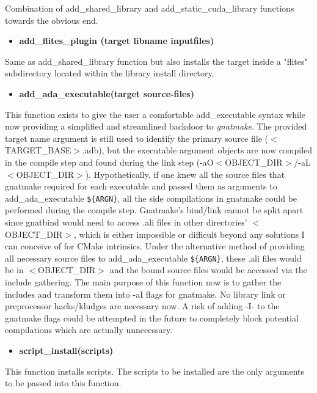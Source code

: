 \documentclass[12pt,letterpaper]{article}
\begin{document}
Combination of add\_shared\_library and add\_static\_cuda\_library functions towards the obvious end.

\begin{itemize}
\item \textbf{add\_flites\_plugin (target libname inputfiles)}
\end{itemize}

Same as add\_shared\_library function but also installs the target inside a "flites" subdirectory located within the library install directory.

\begin{itemize}
\item \textbf{add\_ada\_executable(target source-files)}
\end{itemize}

This function exists to give the user a comfortable add\_executable syntax while now providing a simplified and streamlined backdoor to \emph{gnatmake}.  The provided target name argument is still used to identify the primary source file ($<$TARGET\_BASE$>$.adb), but the executable argument objects are now compiled in the compile step and found during the link step (-aO$<$OBJECT\_DIR$>$/-aL$<$OBJECT\_DIR$>$). Hypothetically, if one knew all the source files that gnatmake required for each executable and passed them as arguments to add\_ada\_executable \verb|${ARGN}|, all the side compilations in gnatmake could be performed during the compile step.  Gnatmake's bind/link cannot be split apart since gnatbind would need to access .ali files in other directories' $<$OBJECT\_DIR$>$, which is either impossible or difficult beyond any solutions I can conceive of for CMake intrinsics.  Under the alternative method of providing all necessary source files to add\_ada\_executable \verb|${ARGN}|, these .ali files would be in $<$OBJECT\_DIR$>$ and the bound source files would be accessed via the include gathering.  The main purpose of this function now is to gather the includes and transform them into -aI flags for gnatmake.  No library link or preprocessor hacks/kludges are necessary now.  A risk of adding -I- to the gnatmake flags could be attempted in the future to completely block potential compilations which are actually unnecessary.

\begin{itemize}
\item \textbf{script\_install(scripts)}
\end{itemize}

This function installs scripts.  The scripts to be installed are the only arguments to be passed into this function.
\end{document}
